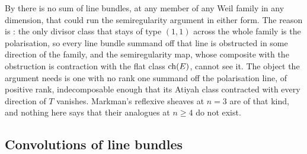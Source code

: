 \begin{remark}\label{rem:nolinemeaning}
By  there is no sum of line bundles, at any member of any
Weil family in any dimension, that could run the semiregularity argument in
either form. The reason is \cite[Proposition~9.15(i)]{paperI}: the
only divisor class that stays of type $(1,1)$ across the whole family is the
polarisation, so every line bundle summand off that line is obstructed in
some direction of the family, and the semiregularity map, whose composite
with the obstruction is contraction with the flat class $\operatorname{ch}(E)$, cannot see
it. The object the argument needs is one with no rank one
summand off the polarisation line, of positive rank, indecomposable enough
that its Atiyah class contracted with every direction of $T$ vanishes.
Markman's reflexive sheaves at $n=3$ are of that kind, and nothing here
says that their analogues at $n\ge4$ do not exist.
\end{remark}

\subsection{Convolutions of line bundles}\label{ssec:convolutions}

